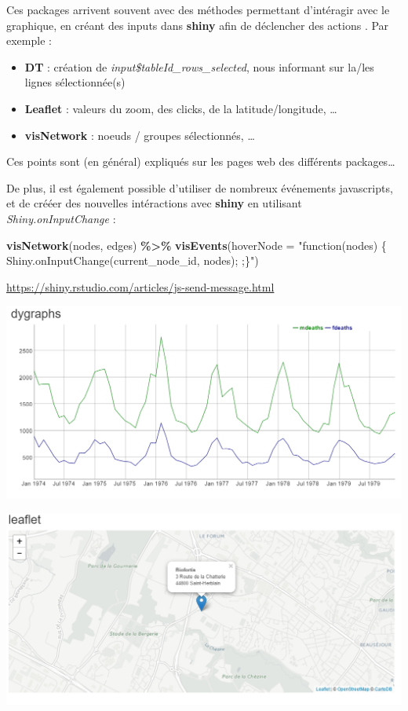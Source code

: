 \documentclass[
]{article}
\newenvironment{Shaded}{\begin{snugshade}}{\end{snugshade}}
\newcommand{\AttributeTok}[1]{\textcolor[rgb]{0.13,0.29,0.53}{#1}}
\newcommand{\FunctionTok}[1]{\textcolor[rgb]{0.13,0.29,0.53}{\textbf{#1}}}
\newcommand{\NormalTok}[1]{#1}
\newcommand{\SpecialCharTok}[1]{\textcolor[rgb]{0.81,0.36,0.00}{\textbf{#1}}}
\newcommand{\StringTok}[1]{\textcolor[rgb]{0.31,0.60,0.02}{#1}}
\providecommand{\tightlist}{%
  \setlength{\itemsep}{0pt}\setlength{\parskip}{0pt}}
\begin{document}
Ces packages arrivent souvent avec des méthodes permettant d'intéragir
avec le graphique, en créant des inputs dans \textbf{shiny} afin de
déclencher des actions . Par exemple :

\begin{itemize}
\tightlist
\item
  \textbf{DT} : création de \emph{input\$tableId\_rows\_selected}, nous
  informant sur la/les lignes sélectionnée(s)
\item
  \textbf{Leaflet} : valeurs du zoom, des clicks, de la
  latitude/longitude, \ldots{}
\item
  \textbf{visNetwork} : noeuds / groupes sélectionnés, \ldots{}
\end{itemize}

Ces points sont (en général) expliqués sur les pages web des différents
packages\ldots{}

De plus, il est également possible d'utiliser de nombreux événements
javascripts, et de crééer des nouvelles intéractions avec \textbf{shiny}
en utilisant \emph{Shiny.onInputChange} :

\begin{Shaded}
\begin{Highlighting}[]
\FunctionTok{visNetwork}\NormalTok{(nodes, edges) }\SpecialCharTok{\%\textgreater{}\%}
      \FunctionTok{visEvents}\NormalTok{(}\AttributeTok{hoverNode =} \StringTok{"function(nodes) \{}
\StringTok{        Shiny.onInputChange(\textquotesingle{}current\_node\_id\textquotesingle{}, nodes);}
\StringTok{      ;\}"}\NormalTok{)}
\end{Highlighting}
\end{Shaded}

\url{https://shiny.rstudio.com/articles/js-send-message.html}

\includegraphics{img/dygraphs.png}

\includegraphics{img/leaflet.png}
\end{document}
